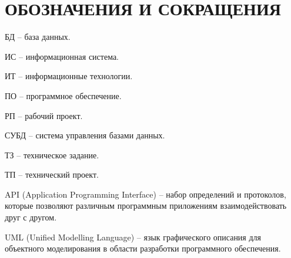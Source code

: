 \section*{ОБОЗНАЧЕНИЯ И СОКРАЩЕНИЯ}

БД -- база данных.

ИС -- информационная система.

ИТ -- информационные технологии. 

ПО -- программное обеспечение.

РП -- рабочий проект.

СУБД -- система управления базами данных.

ТЗ -- техническое задание.

ТП -- технический проект.

API (Application Programming Interface) --  набор определений и протоколов, которые позволяют различным программным приложениям взаимодействовать друг с другом. 

UML (Unified Modelling Language) -- язык графического описания для объектного моделирования в области разработки программного обеспечения.
